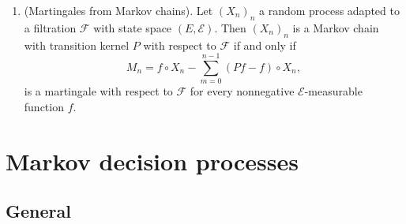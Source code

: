 \documentclass[a4paper,10pt]{scrbook}
\begin{document}
\begin{enumerate}
 \item (Martingales from Markov chains). Let \((X_n)_n\) a random process adapted to a 
       filtration \(\mathscr{F}\) with state space \((E, \mathcal{E})\). Then \((X_n)_n\) is a Markov chain with transition 
       kernel \(P\) with respect to \(\mathscr{F}\) if and only if 
       \[
        M_n = f\circ X_n - \sum_{m=0}^{n-1}(Pf - f)\circ X_n,
       \]
       is a martingale with respect to \(\mathscr{F}\) for every nonnegative \(\mathcal{E}\)-measurable
       function \(f\).
\end{enumerate}

\section{Markov decision processes}

\subsection{General}
\end{document}
